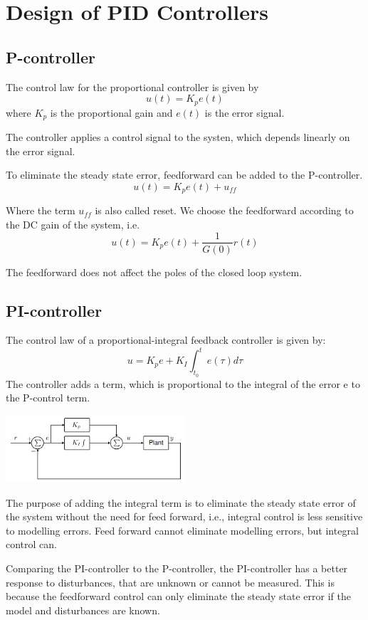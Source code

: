 \section{Design of PID Controllers}

\subsection{P-controller}

The control law for the proportional controller is given by
$$ u(t) = K_p e(t) $$
where $K_p$ is the proportional gain and $e(t)$ is the error signal.

The controller applies a control signal to the systen,
which depends linearly on the error signal.

To eliminate the steady state error, feedforward
can be added to the P-controller.
$$ u(t) = K_p e(t) + u_{ff} $$

Where the term $u_{ff}$ is also called reset. We choose the feedforward
according to the DC gain of the system, i.e.
$$ u(t) = K_p e(t) + \frac{1}{G(0)} r(t) $$

The feedforward does not affect the poles of the closed loop system.

\subsection{PI-controller}

The control law of a proportional-integral feedback controller is given by:
$$u = K_p e + K_I \int_{t_0}^t e(\tau) d\tau$$
The controller adds a term, which is proportional to the integral of the error
e to the P-control term.

\begin{center}
	\includegraphics[width = 0.5\textwidth]{Images/PI-controller.png}
\end{center}

The purpose of adding the integral term is to
eliminate the steady state error of the system without the need for
feed forward, i.e., integral control is less sensitive to modelling errors.
Feed forward cannot eliminate modelling errors, but integral control can.

Comparing the PI-controller to the P-controller, the PI-controller has
a better response to disturbances, that are unknown or cannot be measured.
This is because the feedforward control can only eliminate the steady state error
if the model and disturbances are known.



